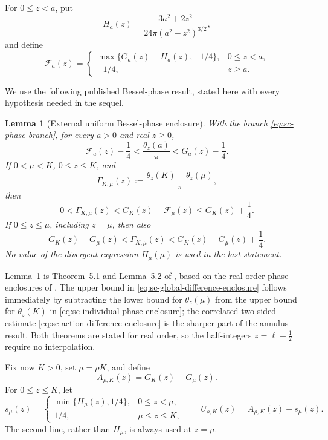 \documentclass[11pt]{article}
\numberwithin{equation}{section}
\newtheorem{lemma}[theorem]{Lemma}
\theoremstyle{definition}
\theoremstyle{remark}
\begin{document}
For \(0\le z<a\), put
\[
  H_a(z)=\frac{3a^2+2z^2}{24\pi(a^2-z^2)^{3/2}},
\]
and define
\begin{equation}
  \mathcal F_a(z)=
  \begin{cases}
  \max\{G_a(z)-H_a(z),-1/4\},&0\le z<a,\\
  -1/4,&z\ge a.
  \end{cases}
  \label{eq:sc-auxiliary-F}
\end{equation}

We use the following published Bessel-phase result, stated here with every
hypothesis needed in the sequel.

\begin{lemma}[External uniform Bessel-phase enclosure]
\label{lem:sc-external-phase}
With the branch \eqref{eq:sc-phase-branch}, for every \(a>0\) and real
\(z\ge0\),
\begin{equation}
  \mathcal F_a(z)-\frac14
  <\frac{\theta_z(a)}\pi
  <G_a(z)-\frac14.
  \label{eq:sc-individual-phase-enclosure}
\end{equation}
If \(0<\mu<K\), \(0\le z\le K\), and
\[
  \Gamma_{K,\mu}(z)
  :=\frac{\theta_z(K)-\theta_z(\mu)}\pi,
\]
then
\begin{equation}
  0<\Gamma_{K,\mu}(z)
  <G_K(z)-\mathcal F_\mu(z)
  \le G_K(z)+\frac14.
  \label{eq:sc-global-difference-enclosure}
\end{equation}
If \(0\le z\le\mu\), including \(z=\mu\), then also
\begin{equation}
  G_K(z)-G_\mu(z)
  <\Gamma_{K,\mu}(z)
  <G_K(z)-G_\mu(z)+\frac14.
  \label{eq:sc-action-difference-enclosure}
\end{equation}
No value of the divergent expression \(H_\mu(\mu)\) is used in the last
statement.
\end{lemma}

Lemma~\ref{lem:sc-external-phase} is Theorem~5.1 and Lemma~5.2 of
\cite{FLPSannuli}, based on the real-order phase enclosures of
\cite{FLPSphase}.  The upper bound in
\eqref{eq:sc-global-difference-enclosure} follows immediately by subtracting
the lower bound for \(\theta_z(\mu)\) from the upper bound for
\(\theta_z(K)\) in \eqref{eq:sc-individual-phase-enclosure}; the correlated
two-sided estimate \eqref{eq:sc-action-difference-enclosure} is the sharper
part of the annulus result.  Both theorems are stated for real order, so the
half-integers \(z=\ell+\tfrac12\) require no interpolation.

Fix now \(K>0\), set \(\mu=\rho K\), and define
\begin{equation}
  A_{\rho,K}(z)=G_K(z)-G_\mu(z).
  \label{eq:sc-shell-action}
\end{equation}
For \(0\le z\le K\), let
\begin{equation}
  s_\mu(z)=
  \begin{cases}
  \min\{H_\mu(z),1/4\},&0\le z<\mu,\\
  1/4,&\mu\le z\le K,
  \end{cases}
  \qquad
  U_{\rho,K}(z)=A_{\rho,K}(z)+s_\mu(z).
  \label{eq:sc-optimized-proxy}
\end{equation}
The second line, rather than \(H_\mu\), is always used at \(z=\mu\).
\end{document}
